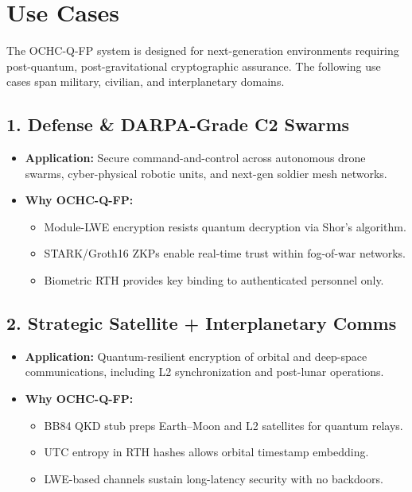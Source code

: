 \documentclass[12pt]{article}
\begin{document}
\section*{Use Cases}

The OCHC-Q-FP system is designed for next-generation environments requiring post-quantum, post-gravitational cryptographic assurance. The following use cases span military, civilian, and interplanetary domains.

\subsection*{1. Defense \& DARPA-Grade C2 Swarms}

\begin{itemize}
    \item \textbf{Application:} Secure command-and-control across autonomous drone swarms, cyber-physical robotic units, and next-gen soldier mesh networks.
    \item \textbf{Why OCHC-Q-FP:}
    \begin{itemize}
        \item Module-LWE encryption resists quantum decryption via Shor’s algorithm.
        \item STARK/Groth16 ZKPs enable real-time trust within fog-of-war networks.
        \item Biometric RTH provides key binding to authenticated personnel only.
    \end{itemize}
\end{itemize}

\subsection*{2. Strategic Satellite + Interplanetary Comms}

\begin{itemize}
    \item \textbf{Application:} Quantum-resilient encryption of orbital and deep-space communications, including L2 synchronization and post-lunar operations.
    \item \textbf{Why OCHC-Q-FP:}
    \begin{itemize}
        \item BB84 QKD stub preps Earth–Moon and L2 satellites for quantum relays.
        \item UTC entropy in RTH hashes allows orbital timestamp embedding.
        \item LWE-based channels sustain long-latency security with no backdoors.
    \end{itemize}
\end{itemize}
\end{document}
